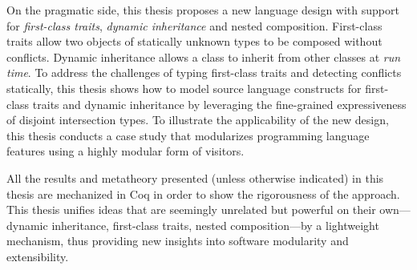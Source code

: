 On the pragmatic side, this thesis proposes a new language design with support
for \textit{first-class traits}, \textit{dynamic inheritance} and nested
composition. First-class traits allow two objects of statically unknown types
to be composed without conflicts. Dynamic inheritance allows a class to inherit
from other classes at \textit{run time}. To address the challenges of typing
first-class traits and detecting conflicts statically, this thesis shows how to
model source language constructs for first-class traits and dynamic inheritance
by leveraging the fine-grained expressiveness of disjoint intersection types. To
illustrate the applicability of the new design, this thesis conducts a case
study that modularizes programming language features using a highly modular form
of visitors.

All the results and metatheory presented (unless otherwise indicated) in this
thesis are mechanized in Coq in order to show the rigorousness of the approach.
This thesis unifies ideas that are seemingly unrelated but powerful on their
own---dynamic inheritance, first-class traits, nested composition---by a
lightweight mechanism, thus providing new insights into software modularity and
extensibility.
